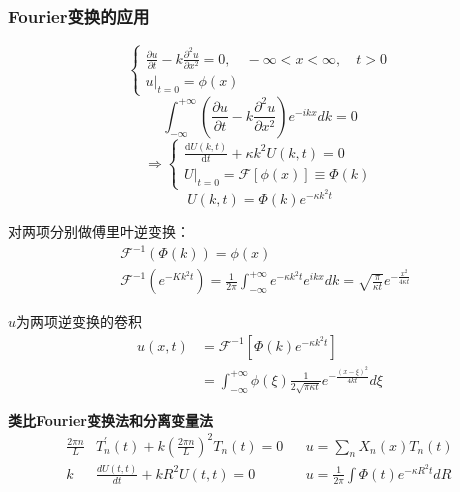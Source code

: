 \subsubsection{Fourier变换的应用}
\begin{ex}[一维无限热传导]
    $$\begin{cases}
        \frac{\partial u}{\partial t}-k\frac{\partial^2 u}{\partial x^{2}}=0, \quad-\infty<x<\infty, \quad t>0\\
        u|_{t=0}=\phi(x)
    \end{cases}$$
    $$\int_{-\infty}^{+\infty}(\frac{\partial u}{\partial t}-k\frac{\partial^{2}u}{\partial x^{2}})e^{-ikx}dk=0$$
    $$\Rightarrow
    \begin{cases}
        \frac{\mathrm{d}U(k,t)}{\mathrm{d}t}+\kappa k^{2}U(k,t)=0\\
        U|_{t=0}=\mathscr{F}[\phi(x)]\equiv\Phi(k)
    \end{cases}$$
    $$U(k,t)=\Phi(k)e^{-\kappa k^{2}t}$$
    

    对两项分别做傅里叶逆变换：
    $$\begin{aligned}
        &\mathscr{F}^{-1}(\Phi(k))=\phi(x)\\
        &\mathscr{F}^{-1}(e^{-Kk^{2}t})=\frac{1}{2\pi}\int_{-\infty}^{+\infty}e^{-\kappa k^{2}t}e^{ikx}dk=\sqrt{\frac{\pi}{\kappa t}}e^{-\frac{x^{2}}{4\kappa t}}
    \end{aligned}$$

    $u$为两项逆变换的卷积
    $$\begin{aligned}
        u(x,t)&=\mathscr{F}^{-1}[\Phi(k)e^{-\kappa k^{2}t}]\\
        &=\int_{-\infty}^{+\infty}\phi(\xi)\frac{1}{2\sqrt{\pi \kappa t}}e^{-\frac{(x-\xi)^{2}}{4kt}}d\xi
    \end{aligned}$$

    \noindent\textbf{类比Fourier变换法和分离变量法}
    $$\begin{array}{cccc}
        \frac{2\pi n}{L}&T_{n}^{\prime}(t)+k(\frac{2\pi n}{L})^{2}T_{n}(t)=0    &&u=\sum_{n}X_{n}(x)T_{n}(t)\\
        k&\frac{dU(t,t)}{dt}+kR^{2}U(t,t)=0         &&u=\frac{1}{2\pi}\int\Phi(t)e^{-\kappa R^{2}t}dR
    \end{array}$$
\end{ex}


